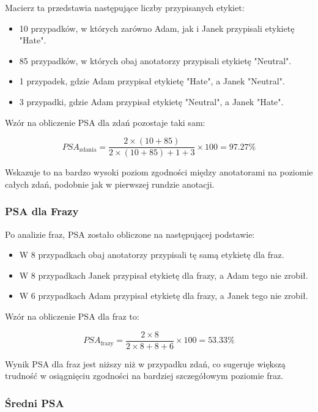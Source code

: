 \documentclass[12pt]{article}
\begin{document}
Macierz ta przedstawia następujące liczby przypisanych etykiet:
\begin{itemize}
    \item 10 przypadków, w których zarówno Adam, jak i Janek przypisali etykietę "Hate".
    \item 85 przypadków, w których obaj anotatorzy przypisali etykietę "Neutral".
    \item 1 przypadek, gdzie Adam przypisał etykietę "Hate", a Janek "Neutral".
    \item 3 przypadki, gdzie Adam przypisał etykietę "Neutral", a Janek "Hate".
\end{itemize}

Wzór na obliczenie PSA dla zdań pozostaje taki sam:

\begin{dmath}
PSA_{\text{zdania}} = \frac{2 \times (10 + 85)}{2 \times (10 + 85) + 1 + 3} \times 100 = 97.27\%
\end{dmath}

Wskazuje to na bardzo wysoki poziom zgodności między anotatorami na poziomie całych zdań, podobnie jak w pierwszej rundzie anotacji.

\subsubsection{PSA dla Frazy}

Po analizie fraz, PSA zostało obliczone na następującej podstawie:
\begin{itemize}
    \item W 8 przypadkach obaj anotatorzy przypisali tę samą etykietę dla fraz.
    \item W 8 przypadkach Janek przypisał etykietę dla frazy, a Adam tego nie zrobił.
    \item W 6 przypadkach Adam przypisał etykietę dla frazy, a Janek tego nie zrobił.
\end{itemize}

Wzór na obliczenie PSA dla fraz to:

\begin{dmath}
PSA_{\text{frazy}} = \frac{2 \times 8}{2 \times 8 + 8 + 6} \times 100 = 53.33\%
\end{dmath}

Wynik PSA dla fraz jest niższy niż w przypadku zdań, co sugeruje większą trudność w osiągnięciu zgodności na bardziej szczegółowym poziomie fraz.

\subsubsection{Średni PSA}
\end{document}

